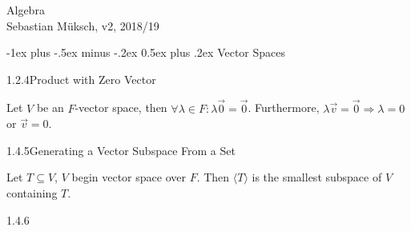 \documentclass[10pt]{article} %
\makeatletter
\renewcommand{\leq}{\leqslant}
\DeclareRobustCommand{\InnerProduct}[2]{
    \ifmmode
        \left( #1,#2 \right)
    \else
        \GenericError{\space\space\space\space}
        {Attempting to use \InnerProduct outside of math mode}
    \fi
}
\DeclareRobustCommand{\Norm}[1]{
    \ifmmode
        \left\lVert #1 \right\rVert
    \else
        \GenericError{\space\space\space\space}
        {Attempting to use \Norm outside of math mode}
    \fi
}
\renewcommand{\section}{\@startsection{section}{1}{0mm}%
                                {-1ex plus -.5ex minus -.2ex}%
                                {0.5ex plus .2ex}%
                                {\normalfont\large\bfseries}}
\makeatother
\begin{document}
\raggedright
\footnotesize
\begin{multicols}{3}


\setlength{\premulticols}{1pt}
\setlength{\postmulticols}{1pt}
\setlength{\multicolsep}{1pt}
\setlength{\columnsep}{2pt}
\setlength{\columnseprule}{0.4pt} %

\begin{center}
     \Large{Algebra} \\
     \footnotesize{Sebastian Müksch, v2, 2018/19}
\end{center}

%
%
%
%


\section{Vector Spaces}

\begin{lemma}{1.2.4}{Product with Zero Vector}

    Let $V$ be an $F$-vector space, then $\forall \lambda \in F: \lambda \vec{0} = \vec{0}$. Furthermore, $\lambda \vec{v} = \vec{0} \Rightarrow \lambda = 0$ or $\vec{v} = 0$.

\end{lemma}

\begin{proposition}{1.4.5}{Generating a Vector Subspace From a Set}

    Let $T \subseteq V$, $V$ begin vector space over $F$. Then $\langle T \rangle$ is the smallest subspace of $V$ containing $T$.

\end{proposition}

\begin{example}{1.4.6}{}


\end{example}
\end{multicols}
\end{document}
